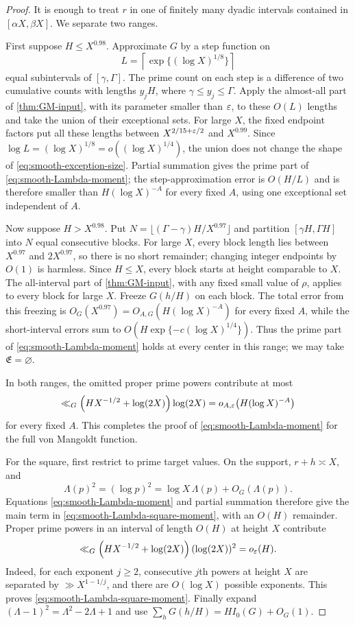 \begin{proof}
 It is enough to treat $r$ in one of finitely many dyadic intervals
 contained in $[\alpha X,\beta X]$.  We separate two ranges.

 First suppose $H\leq X^{0.98}$.  Approximate $G$ by a step function on
 \[
  L=\left\lceil\exp\{(\log X)^{1/8}\}\right\rceil
 \]
 equal subintervals of $[\gamma,\Gamma]$.  The prime count
 on each step is a difference of two cumulative counts with lengths
 $y_jH$, where $\gamma\leq y_j\leq\Gamma$.  Apply the almost-all part of
 \cref{thm:GM-input}, with its parameter smaller than $\varepsilon$, to these
 $O(L)$ lengths and take the union of their exceptional sets.  For large
 $X$, the fixed endpoint factors put all these lengths between
 $X^{2/15+\varepsilon/2}$ and $X^{0.99}$.  Since
 $\log L=(\log X)^{1/8}=o((\log X)^{1/4})$, the union does not change the
 shape of \eqref{eq:smooth-exception-size}.  Partial summation gives the
 prime part of \eqref{eq:smooth-Lambda-moment}; the step-approximation
 error is $O(H/L)$ and is therefore smaller than
 $H(\log X)^{-A}$ for every fixed $A$, using one exceptional set
 independent of $A$.

 Now suppose $H>X^{0.98}$.  Put
 $N=\lfloor(\Gamma-\gamma)H/X^{0.97}\rfloor$ and partition
 $[\gamma H,\Gamma H]$ into $N$ equal consecutive blocks.  For large
 $X$, every block length lies between $X^{0.97}$ and $2X^{0.97}$, so
 there is no short remainder; changing integer endpoints by $O(1)$ is
 harmless.
 Since $H\leq X$, every block starts at height comparable to
 $X$.  The all-interval part of \cref{thm:GM-input}, with any fixed small
 value of $\rho$, applies to every block for large $X$.  Freeze $G(h/H)$
 on each block.  The total error from this freezing is
 $O_G(X^{0.97})=O_{A,G}(H(\log X)^{-A})$ for every fixed $A$, while the
 short-interval errors sum to
 $O(H\exp\{-c(\log X)^{1/4}\})$.  Thus the prime part of
 \eqref{eq:smooth-Lambda-moment} holds at every center in this range; we
 may take $\mathfrak E=\varnothing$.

 In both ranges, the omitted proper prime powers contribute at most
 \[
  \ll_G\left(HX^{-1/2}+\log(2X)\right)\log(2X)
  =o_{A,\varepsilon}\bigl(H(\log X)^{-A}\bigr)
 \]
 for every fixed $A$.  This completes the proof of
 \eqref{eq:smooth-Lambda-moment} for the full von Mangoldt function.

For the square, first restrict to prime target values.  On the support,
$r+h\asymp X$, and
\[
 \Lambda(p)^2=(\log p)^2
 =\log X\,\Lambda(p)+O_G(\Lambda(p)).
\]
Equations \eqref{eq:smooth-Lambda-moment} and partial summation therefore
give the main term in \eqref{eq:smooth-Lambda-square-moment}, with an
$O(H)$ remainder.  Proper prime powers in an interval of length $O(H)$
at height $X$ contribute
\[
 \ll_G\left(HX^{-1/2}+\log(2X)\right)(\log(2X))^2=o_\varepsilon(H).
\]
Indeed, for each exponent $j\geq2$, consecutive $j$th powers at height
$X$ are separated by $\gg X^{1-1/j}$, and there are $O(\log X)$ possible
exponents.  This proves \eqref{eq:smooth-Lambda-square-moment}.
Finally expand $(\Lambda-1)^2=\Lambda^2-2\Lambda+1$ and use
$\sum_hG(h/H)=HI_0(G)+O_G(1)$.
\end{proof}

